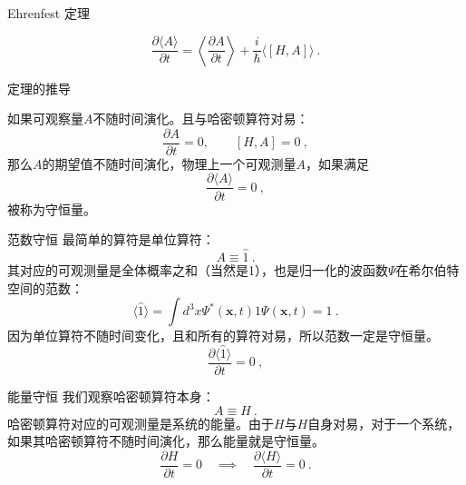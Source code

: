 

\begin{theorem}{Ehrenfest 定理}
\end{theorem}
\begin{equation}
\frac{\partial\langle A\rangle}{\partial t}=\left\langle\frac{\partial A}{\partial t}\right\rangle+\frac{i}{\hbar}\langle[H, A]\rangle~.
\end{equation}
\begin{issues}
\issueTODO 定理的推导
\end{issues}

如果可观察量$A$不随时间演化。且与哈密顿算符对易：
\begin{equation}
\frac{\partial A}{\partial t}=0,\qquad[H, A]=0~,
\end{equation}
那么$A$的期望值不随时间演化，物理上一个可观测量$A$，如果满足
\begin{equation}
\frac{\partial\langle A\rangle}{\partial t}=0~,
\end{equation}
被称为守恒量。
\begin{example}{范数守恒}
最简单的算符是单位算符：
\begin{equation}
A\equiv \hat 1~.
\end{equation}
其对应的可观测量是全体概率之和（当然是1），也是归一化的波函数$\Psi$在希尔伯特空间的范数：
\begin{equation}
\langle\hat{1}\rangle=\int d^{3}x \Psi^{*}(\boldsymbol{x}, t) 1 \Psi(\boldsymbol{x}, t)=1~.
\end{equation}
因为单位算符不随时间变化，且和所有的算符对易，所以范数一定是守恒量。
\begin{equation}
\frac{\partial\langle \hat 1\rangle}{\partial t}=0~,
\end{equation}
\end{example}
\begin{example}{能量守恒}
我们观察哈密顿算符本身：
\begin{equation}
A\equiv H~.
\end{equation}
哈密顿算符对应的可观测量是系统的能量。由于$H$与$H$自身对易，对于一个系统，如果其哈密顿算符不随时间演化，那么能量就是守恒量。
\begin{equation}
\frac{\partial H}{\partial t}=0 \quad\implies\quad \frac{\partial\langle H\rangle}{\partial t}=0~.
\end{equation}
\end{example}
